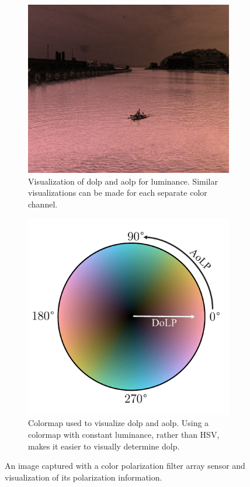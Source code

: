 \begin{figure}[H]\ContinuedFloat
    \begin{subfigure}[B]{.49\textwidth}
        \includegraphics[width=\textwidth]{figures/img_0080_right_pol.jpg}
        \caption{Visualization of \gls{dolp} and \gls{aolp} for luminance. Similar visualizations can be made for each separate color channel.}
    \end{subfigure}
    \hfill
    \begin{subfigure}[B]{.49\textwidth}
        \centering
        \includegraphics[width=.8\textwidth]{figures/cmap/aolp_dolp_cmap.pdf}
        \vspace{1em}
        \caption{Colormap used to visualize \gls{dolp} and \gls{aolp}. Using a colormap with constant luminance, rather than HSV, makes it easier to visually determine \gls{dolp}. }
    \end{subfigure}
    \caption{An image captured with a color polarization filter array sensor and visualization of its polarization information. \label{fig:cpfa_demosaicking}}
\end{figure}

